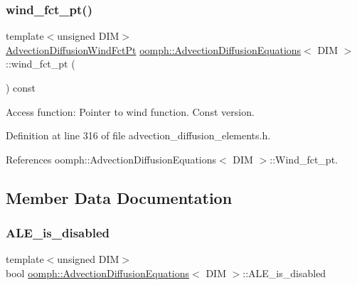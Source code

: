 \subsubsection{\texorpdfstring{wind\+\_\+fct\+\_\+pt()}{wind\_fct\_pt()}\hspace{0.1cm}{\footnotesize\ttfamily [2/2]}}
{\footnotesize\ttfamily template$<$unsigned D\+IM$>$ \\
\hyperlink{classoomph_1_1AdvectionDiffusionEquations_a341db90b2eaf704f3286a9fcde7c614a}{Advection\+Diffusion\+Wind\+Fct\+Pt} \hyperlink{classoomph_1_1AdvectionDiffusionEquations}{oomph\+::\+Advection\+Diffusion\+Equations}$<$ D\+IM $>$\+::wind\+\_\+fct\+\_\+pt (\begin{DoxyParamCaption}{ }\end{DoxyParamCaption}) const\hspace{0.3cm}{\ttfamily [inline]}}



Access function\+: Pointer to wind function. Const version. 



Definition at line 316 of file advection\+\_\+diffusion\+\_\+elements.\+h.



References oomph\+::\+Advection\+Diffusion\+Equations$<$ D\+I\+M $>$\+::\+Wind\+\_\+fct\+\_\+pt.



\subsection{Member Data Documentation}
\mbox{\label{classoomph_1_1AdvectionDiffusionEquations_a049fe0ee23a9dda3de6edb2ca582e48c}} 
\subsubsection{\texorpdfstring{A\+L\+E\+\_\+is\+\_\+disabled}{ALE\_is\_disabled}}
{\footnotesize\ttfamily template$<$unsigned D\+IM$>$ \\
bool \hyperlink{classoomph_1_1AdvectionDiffusionEquations}{oomph\+::\+Advection\+Diffusion\+Equations}$<$ D\+IM $>$\+::A\+L\+E\+\_\+is\+\_\+disabled\hspace{0.3cm}{\ttfamily [protected]}}



